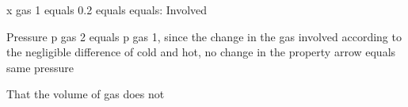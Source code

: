 x gas 1 equals 0.2 equals equals: Involved

Pressure p gas 2 equals p gas 1, since the change in the gas involved according to the negligible difference of cold and hot, no change in the property arrow equals same pressure

That the volume of gas does not